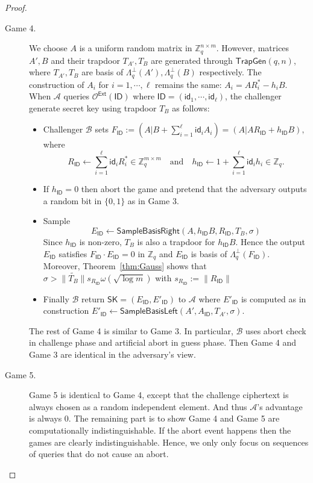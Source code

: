 \documentclass[runningheads,10pt]{llncs}
\def\ZZ{\mathbb{Z}}
\def\cal{\mathcal}
\def\TrapGen{\mathsf{TrapGen}}
\def\SK{\mathsf{SK}}
\def\SampleBasisLeft{\mathsf{SampleBasisLeft}}
\def\SampleBasisRight{\mathsf{SampleBasisRight}}
\def\Ext{\mathsf{Ext}}
\def\Pr{\mathrm{Pr}}
\def\Lp{\Lambda^{\perp}}
\def\ID{\mathsf{ID}}
\def\id{\mathsf{id}}
\def\W{\cal{W}}
\begin{document}
\begin{proof}
\begin{description}
		\item[Game 4.] We choose $A$ is a uniform random matrix in $\ZZ_q^{n\times m}$. However, matrices $A', B$ and their trapdoor $T_{A'}, T_B$ are generated through $\TrapGen(q,n)$, where $T_{A'}, T_B$ are basis of $\Lp_q(A'), \Lp_q(B)$ respectively. The construction of $A_i$ for $i=1,\cdots,\ell$ remains the same: $A_i=AR_i^*-h_iB$. When $\cal{A}$ queries $\cal{O}^{\Ext}(\ID)$ where $\ID=(\id_1,\cdots,\id_\ell)$, the challenger generate secret key using trapdoor $T_B$ as follows:
		\begin{itemize}
			\item Challenger $\cal{B}$ sets
			$F_\ID:=(A|B+\sum_{i=1}^\ell \id_iA_i) = (A|AR_{\ID} + h_{\ID} B),$
			where
			\begin{equation}\label{eq:R and h}
			R_\ID\gets\sum_{i=1}^\ell \id_iR_i^*\in\ZZ_q^{m\times m}\quad\text{and}\quad h_\ID\gets 1+\sum_{i=1}^\ell \id_ih_i\in\ZZ_q.
			\end{equation}
			\item If $h_\ID=0$ then abort the game and pretend that the adversary outputs a random bit in $\{0,1\}$ as in Game 3.
			\item Sample 
			$$E_\ID\gets\SampleBasisRight(A,h_\ID B,R_\ID,T_B,\sigma)$$
			Since $h_\ID$ is non-zero, $T_B$ is also a trapdoor for $h_{\ID} B$. Hence the output $E_\ID$ satisfies $F_\ID\cdot E_{\ID} = 0$ in $\ZZ_q$ and $E_{\ID}$ is basis of $\Lambda_q^\perp(F_\ID)$. Moreover, Theorem~\ref{thm:Gauss} shows that  $\sigma>\|\widetilde{T_B}\|s_{R_\ID}\omega(\sqrt{\log m})$ with $s_{R_\ID}:=\|R_\ID\|$
			\item Finally $\cal{B}$ return $\SK=(E_\ID, E'_\ID)$ to $\cal{A}$ where $E'_\ID$ is computed as in construction
			$E'_{\ID}\gets\SampleBasisLeft(A',A_{\ID},T_{A'},\sigma).$
		\end{itemize}
		
		The rest of Game 4 is similar to Game 3. In particular, $\cal{B}$ uses abort check in challenge phase and artificial abort in guess phase. Then Game 4 and Game 3 are identical in the adversary's view.
		
		\item[Game 5.] Game 5 is identical to Game 4, except that the challenge ciphertext is always chosen as a random independent element. And thus $\cal{A}$'s advantage is always $0$. The remaining part is to show Game 4 and Game 5 are computationally indistinguishable. If the abort event happens then the games are clearly indistinguishable. Hence, we only only focus on sequences of queries that do not cause an abort.\\
		

\end{description}
\end{proof}
\end{document}
